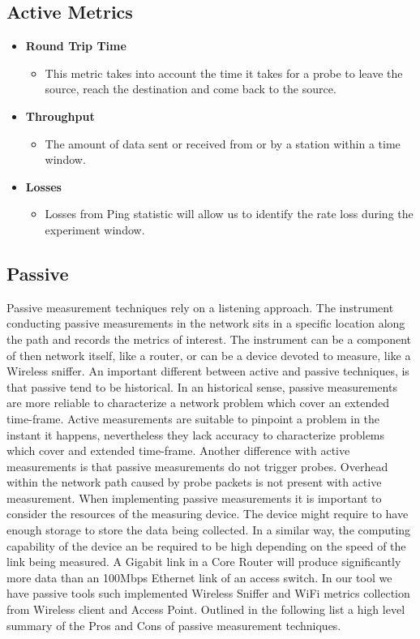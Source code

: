 \subsection*{Active Metrics}

\begin{itemize}
	\item \textbf{Round Trip Time}
	\begin{itemize}
		\item This metric takes into account the time it takes for a probe to leave the source, reach the destination and come back to the source. 
	\end{itemize}
	
	\item \textbf{Throughput}
	\begin{itemize}
		\item The amount of data sent or received from or by a station within a time window. 
	\end{itemize}
	\item \textbf{Losses}
	\begin{itemize}
		\item Losses from Ping statistic will allow us to identify the rate loss during the experiment window.
	\end{itemize}
\end{itemize}

\subsection*{Passive}

Passive measurement techniques rely on a listening approach. The instrument conducting passive measurements in the network sits in a specific location along the path and records the metrics of interest. The instrument can be a component of then network itself, like a router, or can be a device devoted to measure, like a Wireless sniffer. An important different between active and passive techniques, is that passive tend to be historical. In an historical sense, passive measurements are more reliable to characterize a network problem which cover an extended time-frame. Active measurements are suitable to pinpoint a problem in the instant it happens, nevertheless they lack accuracy to characterize problems which cover and extended time-frame. Another difference with active measurements is that passive measurements do not trigger probes. Overhead within the network path caused by probe packets is not present with active measurement. When implementing passive measurements it is important to consider the resources of the measuring device. The device might require to have enough storage to store the data being collected. In a similar way, the computing capability of the device an be required to be high depending on the speed of the link being measured. A Gigabit link in a Core Router will produce significantly more data than an 100Mbps Ethernet link of an access switch. In our tool we have passive tools such implemented Wireless Sniffer and WiFi metrics collection from Wireless client and Access Point.
Outlined in the following list a high level summary of the Pros and Cons of passive measurement techniques.

